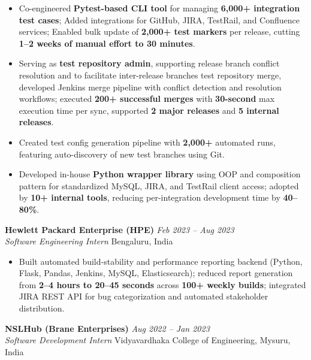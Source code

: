 \documentclass[10pt,a4paper]{article}
\begin{document}
\begin{itemize}[leftmargin=*, itemsep=0.5pt, topsep=3pt]
\item Co-engineered \textbf{Pytest-based CLI tool} for managing \textbf{6,000+ integration test cases}; Added integrations for GitHub, JIRA, TestRail, and Confluence services; Enabled bulk update of \textbf{2,000+ test markers} per release, cutting \textbf{1--2 weeks of manual effort to 30 minutes}.

\item Serving as \textbf{test repository admin}, supporting release branch conflict resolution and to facilitate inter-release branches test repository merge, developed Jenkins merge pipeline with conflict detection and resolution workflows; executed \textbf{200+ successful merges} with \textbf{30-second} max execution time per sync, supported \textbf{2 major releases} and \textbf{5 internal releases}.

\item Created test config generation pipeline with \textbf{2,000+} automated runs, featuring auto-discovery of new test branches using Git.

\item Developed in-house \textbf{Python wrapper library} using OOP and composition pattern for standardized MySQL, JIRA, and TestRail client access; adopted by \textbf{10+ internal tools}, reducing per-integration development time by \textbf{40--80\%}.

\end{itemize}

\vspace{2pt}
\textbf{Hewlett Packard Enterprise (HPE)} \hfill \textit{Feb 2023 -- Aug 2023} \\
\textit{Software Engineering Intern} \hfill Bengaluru, India

\vspace{-2pt}
\begin{itemize}[leftmargin=*, itemsep=0.5pt, topsep=3pt]

\item Built automated build-stability and performance reporting backend (Python, Flask, Pandas, Jenkins, MySQL, Elasticsearch); reduced report generation from \textbf{2--4 hours to 20--45 seconds} across \textbf{100+ weekly builds}; integrated JIRA REST API for bug categorization and automated stakeholder distribution.

\end{itemize}

\vspace{2pt}
\textbf{NSLHub (Brane Enterprises)} \hfill \textit{Aug 2022 -- Jan 2023} \\
\textit{Software Development Intern} \hfill Vidyavardhaka College of Engineering, Mysuru, India
\end{document}
